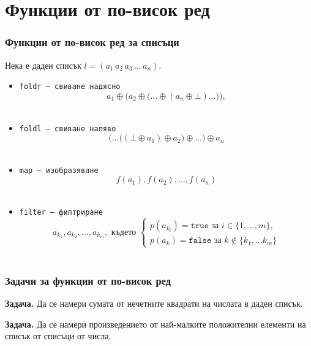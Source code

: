 \documentclass{beamer}
\begin{document}
\section{Функции от по-висок ред}

\begin{frame}
  \frametitle{Функции от по-висок ред за списъци}

  Нека е даден списък $l = (a_1\,a_2\,a_3\,\ldots\,a_n)$.

  \begin{itemize}[<+->]
  \item \tt{foldr} --- свиване надясно
    \begin{equation*}
      a_1 \oplus \Big(a_2 \oplus \big(\ldots \oplus (a_n \oplus \bot) \ldots\big)\Big),
    \end{equation*}
  \item \tt{foldl} --- свиване наляво
    \begin{equation*}
      \Big(\ldots\big((\bot \oplus a_1) \oplus a_2\big) \oplus \ldots\Big) \oplus a_n
    \end{equation*}
  \item \tt{map} --- изобразяване
    \begin{equation*}
      f(a_1), f(a_2), \ldots, f(a_n)
    \end{equation*}
  \item \tt{filter} --- филтриране
    \begin{equation*}
      a_{k_1}, a_{k_2}, \ldots, a_{k_m},\text{ където }\left\{
      \begin{array}{l}
        p(a_{k_i})=\mathtt{true}\text{ за }i\in\{1,\ldots,m\},\\
        p(a_k)=\mathtt{false}\text{ за }k\notin\{k_1,\ldots k_m\}
      \end{array}\right.
    \end{equation*}
  \end{itemize}
\end{frame}

\begin{frame}
  \frametitle{Задачи за функции от по-висок ред}

  \textbf{Задача.} Да се намери сумата от нечетните квадрати на числата в даден списък.
  \vspace{3em}
  \pause

  \textbf{Задача.} Да се намери произведението от най-малките положителни елементи на списък от списъци от числа.
\end{frame}
\end{document}
